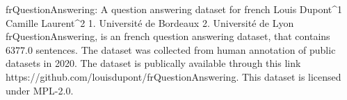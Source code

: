 
frQuestionAnswering: A question answering dataset for french
Louis Dupont^1 Camille Laurent^2
1. Université de Bordeaux 2. Université de Lyon
frQuestionAnswering, is an french question answering dataset, that contains 6377.0 sentences.
The dataset was collected from human annotation of public datasets in 2020. 
The dataset is publically available through this link https://github.com/louisdupont/frQuestionAnswering. This dataset is licensed under MPL-2.0.

